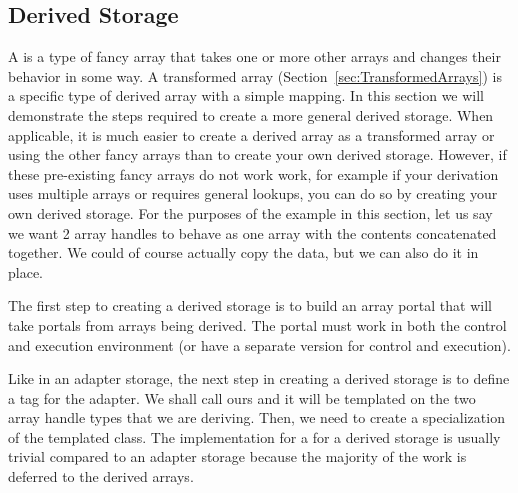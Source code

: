 

\subsection{Derived Storage}
\label{sec:DerivedStorage}


A  is a type of fancy array that takes one or more
other arrays and changes their behavior in some way. A transformed array
(Section~\ref{sec:TransformedArrays}) is a specific type of derived array
with a simple mapping. In this section we will demonstrate the steps
required to create a more general derived storage. When applicable, it is
much easier to create a derived array as a transformed array or using the
other fancy arrays than to create your own derived storage. However, if
these pre-existing fancy arrays do not work work, for example if your
derivation uses multiple arrays or requires general lookups, you can do so
by creating your own derived storage. For the purposes of the example in
this section, let us say we want 2 array handles to behave as one array
with the contents concatenated together. We could of course actually copy
the data, but we can also do it in place.

The first step to creating a derived storage is to build an array portal
that will take portals from arrays being derived. The portal must work in
both the control and execution environment (or have a separate version for
control and execution).


Like in an adapter storage, the next step in creating a derived storage
is to define a tag for the adapter. We shall call ours
 and it will be templated on
the two array handle types that we are deriving. Then, we need to create a
specialization of the templated 
class. The implementation for a  for
a derived storage is usually trivial compared to an adapter storage
because the majority of the work is deferred to the derived arrays.


